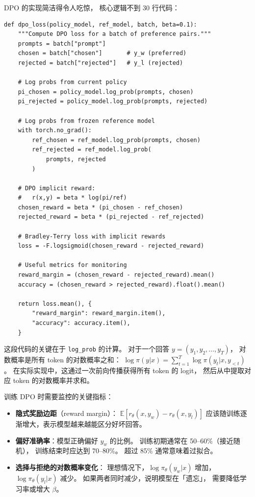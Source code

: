 DPO 的实现简洁得令人吃惊，
核心逻辑不到 30 行代码：

\begin{lstlisting}[caption={DPO training implementation}]
def dpo_loss(policy_model, ref_model, batch, beta=0.1):
    """Compute DPO loss for a batch of preference pairs."""
    prompts = batch["prompt"]
    chosen = batch["chosen"]       # y_w (preferred)
    rejected = batch["rejected"]   # y_l (rejected)

    # Log probs from current policy
    pi_chosen = policy_model.log_prob(prompts, chosen)
    pi_rejected = policy_model.log_prob(prompts, rejected)

    # Log probs from frozen reference model
    with torch.no_grad():
        ref_chosen = ref_model.log_prob(prompts, chosen)
        ref_rejected = ref_model.log_prob(
            prompts, rejected
        )

    # DPO implicit reward:
    #   r(x,y) = beta * log(pi/ref)
    chosen_reward = beta * (pi_chosen - ref_chosen)
    rejected_reward = beta * (pi_rejected - ref_rejected)

    # Bradley-Terry loss with implicit rewards
    loss = -F.logsigmoid(chosen_reward - rejected_reward)

    # Useful metrics for monitoring
    reward_margin = (chosen_reward - rejected_reward).mean()
    accuracy = (chosen_reward > rejected_reward).float().mean()

    return loss.mean(), {
        "reward_margin": reward_margin.item(),
        "accuracy": accuracy.item(),
    }
\end{lstlisting}

这段代码的关键在于 \texttt{log\_prob} 的计算。
对于一个回答 $y = (y_1, y_2, \ldots, y_T)$，
对数概率是所有 token 的对数概率之和：
$\log \pi(y|x) = \sum_{t=1}^T \log \pi(y_t | x, y_{<t})$。
在实际实现中，这通过一次前向传播获得所有 token 的 logit，
然后从中提取对应 token 的对数概率并求和。

训练 DPO 时需要监控的关键指标：
\begin{itemize}[noitemsep]
  \item \textbf{隐式奖励边距}（reward margin）：
        $\mathbb{E}[r_\theta(x, y_w) - r_\theta(x, y_l)]$
        应该随训练逐渐增大，表示模型越来越能区分好坏回答。
  \item \textbf{偏好准确率}：模型正确偏好 $y_w$ 的比例。
        训练初期通常在 50--60\%（接近随机），
        训练结束时应达到 70--80\%。
        超过 85\% 通常意味着过拟合。
  \item \textbf{选择与拒绝的对数概率变化}：
        理想情况下，$\log \pi_\theta(y_w|x)$ 增加，
        $\log \pi_\theta(y_l|x)$ 减少。
        如果两者同时减少，说明模型在「遗忘」，
        需要降低学习率或增大 $\beta$。
\end{itemize}

